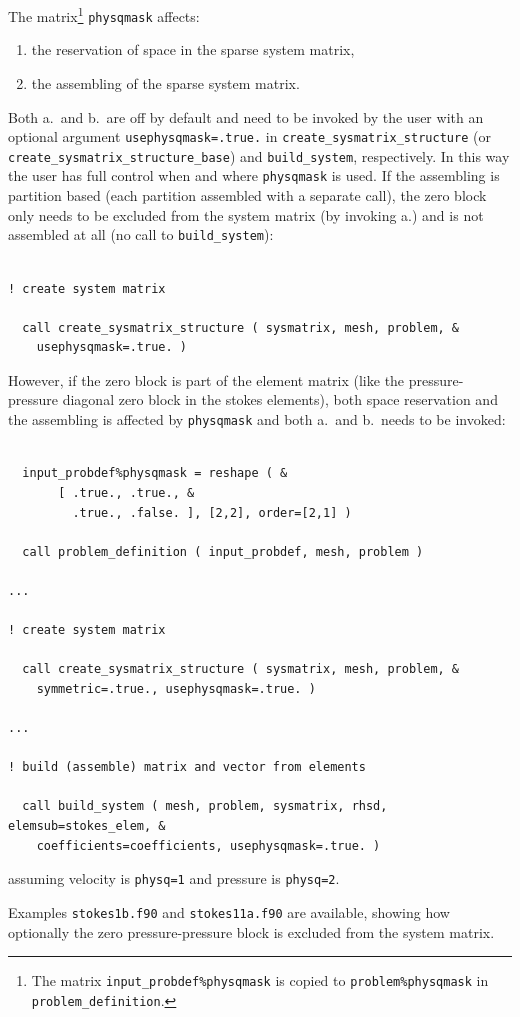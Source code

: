The matrix\footnote{The matrix \texttt{input\_probdef\%physqmask} is copied to 
\texttt{problem\%physqmask} in \texttt{problem\_definition}.} 
\texttt{physqmask} affects:
\begin{enumerate}
 \item[a.] the reservation of space in the sparse system matrix,
 \item[b.] the assembling of the sparse system matrix.
\end{enumerate}
   Both a.\ and b.\ are off by default and need to be invoked by the user with an optional
   argument \texttt{usephysqmask=.true.} in \texttt{create\_sysmatrix\_structure} (or 
   \texttt{create\_sysmatrix\_structure\_base}) and
   \texttt{build\_system}, respectively. 
    In this way the user has full control
   when and where \texttt{physqmask} is used. If the assembling
   is partition based (each partition assembled with a separate call), the zero block only needs to be excluded from
   the system matrix (by invoking a.) and is not assembled at all (no call to \texttt{build\_system}):
   \medskip
\begin{verbatim}

! create system matrix

  call create_sysmatrix_structure ( sysmatrix, mesh, problem, &
    usephysqmask=.true. )

\end{verbatim}
   However, if the zero block is part of the element matrix (like the
   pressure-pressure diagonal zero block in the stokes elements), both space reservation and
   the assembling is affected by \texttt{physqmask} and both
   a.\ and b.\ needs to be invoked:
   \medskip
\begin{verbatim}

  input_probdef%physqmask = reshape ( &
       [ .true., .true., &
         .true., .false. ], [2,2], order=[2,1] )
         
  call problem_definition ( input_probdef, mesh, problem )

...

! create system matrix

  call create_sysmatrix_structure ( sysmatrix, mesh, problem, &
    symmetric=.true., usephysqmask=.true. )

...

! build (assemble) matrix and vector from elements 

  call build_system ( mesh, problem, sysmatrix, rhsd, elemsub=stokes_elem, &
    coefficients=coefficients, usephysqmask=.true. )

\end{verbatim}
assuming velocity is \texttt{physq=1} and pressure is \texttt{physq=2}. 

Examples \texttt{stokes1b.f90} and \texttt{stokes11a.f90} are available, showing how optionally the zero pressure-pressure block is excluded from the system matrix.







